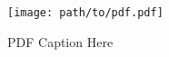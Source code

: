 \begin{figure}[H]
  \centering
  \texttt{[image: path/to/pdf.pdf]}
  \caption{PDF Caption Here}
  \label{fig:pdf}
\end{figure}
